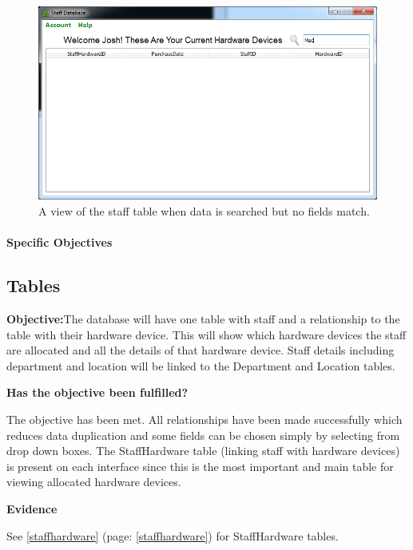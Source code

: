 \begin{figure}[H]
    \includegraphics[width=\textwidth]{./Evaluation/Images/staffsearch2.png}
    \caption{A view of the staff table when data is searched but no fields match.} 
\end{figure}



\paragraph{Specific Objectives}

\subsection{Tables}

\textbf{Objective:}The database will have one table with staff and a relationship to the table with their hardware device. This will show which hardware devices the staff are allocated and all the details of that hardware device. Staff details including department and location will be linked to the Department and Location tables.

\textbf{Has the objective been fulfilled?}

The objective has been met. All relationships have been made successfully which reduces data duplication and some fields can be chosen simply by selecting from drop down boxes. The StaffHardware table (linking staff with hardware devices) is present on each interface since this is the most important and main table for viewing allocated hardware devices.

\textbf{Evidence}

See \ref{staffhardware} (page: \ref{staffhardware}) for StaffHardware tables.

